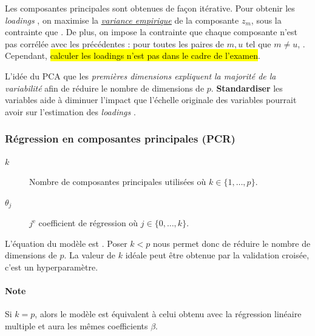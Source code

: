 \documentclass[french]{article}
\begin{document}
\begin{multicols*}{2}
\bigskip

Les composantes principales sont obtenues de façon itérative. Pour obtenir les \og \textit{loadings} \fg{}, on maximise la \textit{\color{bleudefrance}\underline{\hyperlink{empiricalVariance}{\color{bleudefrance} variance empirique}}} de la composante $z_{m}$,  sous la contrainte que . De plus, on impose la contrainte que chaque composante n'est pas corrélée avec les précédentes : pour toutes les paires de $m, u$ tel que $m \neq u$, . Cependant, \hl{calculer les loadings n'est pas dans le cadre de l'examen}.

\bigskip

\begin{rappel_enhanced}[Contexte]
L'idée du PCA que les \textit{premières dimensions expliquent la majorité de la variabilité} afin de réduire le nombre de dimensions de $p$. \textbf{Standardiser} les variables aide à diminuer l'impact que l'échelle originale des variables pourrait avoir sur l'estimation des \og \textit{loadings} \fg{}.
\end{rappel_enhanced}


\subsubsection{Régression en composantes principales (PCR)}\label{subsubsec:PCR}
\begin{distributions}[Notation]
\begin{description}
	\item[$k$]	Nombre de composantes principales utilisées où $k \in \{1, \dots, p\}$.
	\item[$\theta_{j}$]	$j^{\text{e}}$ coefficient de régression où $j \in \{0, \dots, k\}$.
\end{description}
\end{distributions}

L'équation du modèle est . Poser $k < p$ nous permet donc de réduire le nombre de dimensions de $p$. La valeur de $k$ idéale peut être obtenue par la validation croisée, c'est un hyperparamètre.

\paragraph{Note}	Si $k = p$, alors le modèle est équivalent à celui obtenu avec la régression linéaire multiple et aura les mêmes coefficients $\beta$.




\end{multicols*}
\end{document}
